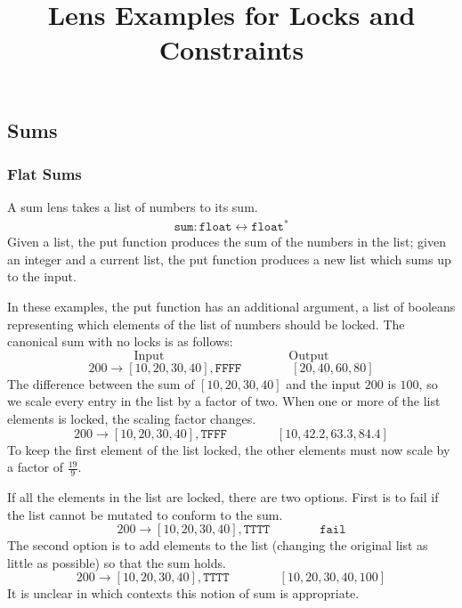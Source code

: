 \documentclass{article}
\title{Lens Examples for Locks and Constraints}
\begin{document}
\maketitle

\newcommand\Sum{\texttt{sum}}
\newcommand\Int{\texttt{int}}
\newcommand\Float{\texttt{float}}
\newcommand\F{\texttt F}
\newcommand\T{\texttt T}
\renewcommand\L{\texttt L}
\newcommand\R{\texttt R}
\newcommand\Fail{\texttt{fail}}

\newcommand\form[4]{#1 \rightarrow #2, #3 \qquad \qquad #4}

\subsection{Sums}

\subsubsection{Flat Sums}
A sum lens takes a list of numbers to its sum. 
\begin{align*}
    \Sum : \Float \leftrightarrow \Float^\ast
\end{align*}
Given a list, the put function produces the sum 
of the numbers in the list; given an integer
and a current list, the put function produces
a new list which sums up to the input.

In these examples, the put function has an additional
argument, a list of booleans representing which elements
of the list of numbers should be locked. 
The canonical sum with no locks is as follows:
\[ \text{Input} \qquad \qquad \qquad \qquad \qquad \text{Output} \]
\[ \form {200} {[10,20,30,40]} {\F\F\F\F} {[20,40,60,80]} \]
The difference between the sum of $[10,20,30,40]$ and the input $200$
is $100$, so we scale every entry in the list by a factor of two. 
When one or more of the list elements is locked, the scaling factor
changes.
\[ \form {200} {[10,20,30,40]} {\T\F\F\F} {[10,42.2,63.3,84.4]} \]
To keep the first element of the list locked, the other elements
must now scale by a factor of $\frac {19} 9$. 

If all the elements in the list are locked, there are two options.
First is to fail if the list cannot be mutated to conform to the
sum.
\[ \form {200} {[10,20,30,40]} {\T\T\T\T} {\Fail} \]
The second option is to add elements to the list (changing
the original list as little as possible) so that the sum holds.
\[ \form {200} {[10,20,30,40]} {\T\T\T\T} {[10,20,30,40,100]} \]
It is unclear in which contexts this notion of sum is appropriate.
\end{document}
